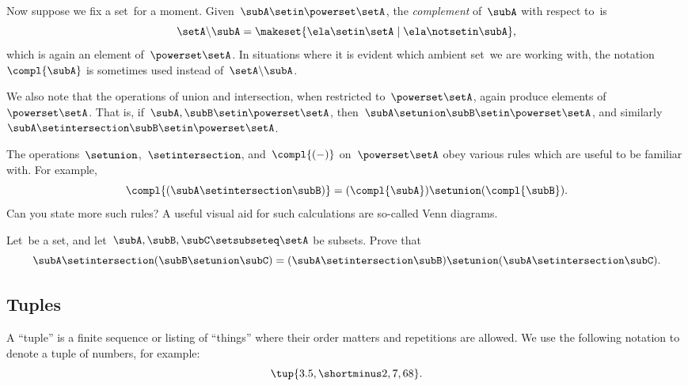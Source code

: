 Now suppose we fix a set~\setA for a moment.
Given~$\subA \setin\powerset \setA$, the \emph{complement} of~$\subA$ with respect to~\setA is
\begin{equation}
    \setA \backslash \subA = \makeset{ \ela \setin\setA \mid \ela \notsetin \subA },
\end{equation}
which is again an element of~$\powerset \setA$.
In situations where it is evident which ambient set~\setA we are working with, the notation~$\compl{\subA}$ is sometimes used instead of~$\setA \backslash \subA$.

We also note that the operations of union and intersection, when restricted to~$\powerset \setA$, again produce elements of~$\powerset \setA$.
That is, if~$\subA, \subB \setin\powerset \setA$, then~$\subA \setunion \subB \setin\powerset \setA$, and similarly~$\subA \setintersection \subB \setin\powerset \setA$.

The operations~$\setunion$,~$\setintersection$, and~$\compl{( - )}$ on~$\powerset \setA$ obey various rules which are useful to be familiar with.
For example,
\begin{equation}
    \compl{(\subA \setintersection \subB)} = (\compl{\subA}) \setunion (\compl{\subB}).
\end{equation}
Can you state more such rules?
A useful visual aid for such calculations are so-called Venn diagrams.


\begin{gradedexercise}
    \label{ex:distributing-subsets}
    Let~\setA be a set, and let~$\subA, \subB, \subC \setsubseteq \setA$ be subsets.
    Prove that
    \begin{equation}
        \subA \setintersection (\subB \setunion \subC) = (\subA \setintersection \subB) \setunion (\subA \setintersection \subC).
    \end{equation}
\end{gradedexercise}


\subsection{Tuples}
\label{sec:tuples}

A ``tuple'' is a finite sequence or listing of ``things'' where their order matters and repetitions are allowed.
We use the following notation to denote a tuple of numbers, for example:
\begin{equation}
    \tup{3.5, \shortminus 2, 7, 68}.
\end{equation}


